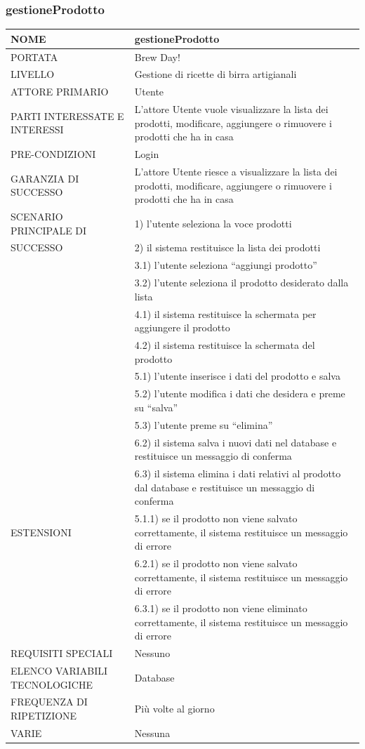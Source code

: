 \documentclass[a4paper, titlepage]{article}
\begin{document}
\subsubsection{gestioneProdotto}
\begin{longtable}{p{6cm}p{7cm}}\toprule
    NOME & gestioneProdotto\\\midrule
    PORTATA & Brew Day!\\\midrule
    LIVELLO & Gestione di ricette di birra artigianali\\\midrule
    ATTORE PRIMARIO & Utente\\\midrule
    PARTI INTERESSATE E INTERESSI & L’attore Utente vuole visualizzare la lista dei prodotti, modificare, aggiungere o rimuovere i prodotti che ha in casa\\\midrule
    PRE-CONDIZIONI & Login\\\midrule
    GARANZIA DI SUCCESSO &  L’attore Utente riesce a visualizzare la lista dei prodotti, modificare, aggiungere o rimuovere i prodotti che ha in casa\\\midrule
    SCENARIO PRINCIPALE DI
    & 1) l’utente seleziona la voce prodotti\\
    SUCCESSO & 2) il sistema restituisce la lista dei prodotti\\
    & 3.1) l’utente seleziona “aggiungi prodotto”\\
    & 3.2) l’utente seleziona il prodotto desiderato dalla lista\\
    & 4.1) il sistema restituisce la schermata per aggiungere il prodotto\\
    & 4.2) il sistema restituisce la schermata del prodotto\\
    & 5.1) l’utente inserisce i dati del prodotto e salva\\
    & 5.2) l’utente modifica i dati che desidera e preme su “salva”\\
    & 5.3) l’utente preme su “elimina”\\
    & 6.2) il sistema salva i nuovi dati nel database e restituisce un messaggio di conferma\\
    & 6.3) il sistema elimina i dati relativi al prodotto dal database e restituisce un messaggio di conferma\\\midrule
    ESTENSIONI
    & 5.1.1) se il prodotto non viene salvato correttamente, il sistema restituisce un messaggio di errore\\
    & 6.2.1) se il prodotto non viene salvato correttamente, il sistema restituisce un messaggio di errore\\
    & 6.3.1) se il prodotto non viene eliminato correttamente, il sistema restituisce un messaggio di errore \\\midrule
    REQUISITI SPECIALI & Nessuno\\\midrule
    ELENCO VARIABILI TECNOLOGICHE & Database\\\midrule
    FREQUENZA DI RIPETIZIONE & Più volte al giorno\\\midrule
    VARIE & Nessuna\\\bottomrule
\end{longtable}
\vphantom{}
\end{document}
